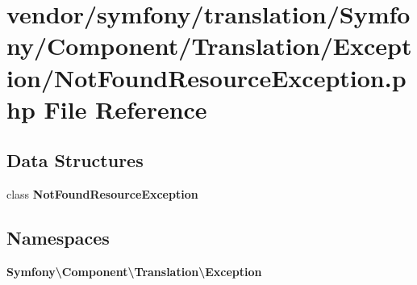 \section{vendor/symfony/translation/\+Symfony/\+Component/\+Translation/\+Exception/\+Not\+Found\+Resource\+Exception.php File Reference}
\label{_not_found_resource_exception_8php}
\subsection*{Data Structures}
\begin{DoxyCompactItemize}
\item 
class {\bf Not\+Found\+Resource\+Exception}
\end{DoxyCompactItemize}
\subsection*{Namespaces}
\begin{DoxyCompactItemize}
\item 
 {\bf Symfony\textbackslash{}\+Component\textbackslash{}\+Translation\textbackslash{}\+Exception}
\end{DoxyCompactItemize}
